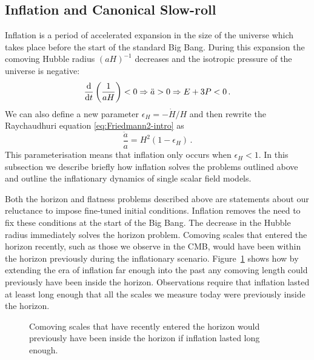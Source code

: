\subsection{Inflation and Canonical Slow-roll}
\label{sec:slowroll-intro}

Inflation is a period of accelerated expansion in the size of the universe
which takes place before the start of the standard Big Bang. During this
expansion the comoving Hubble radius $(aH)^{-1}$ decreases and the isotropic
pressure of the universe is negative:
\begin{equation}
\label{eq:infldefn-intro}
 \frac{\mathrm{d} }{\mathrm{d} t}\left( \frac{1}{aH}\right) <0 \Rightarrow \ddot{a}>0
  \Rightarrow E + 3P < 0 \,.
\end{equation}
We can also define a new parameter $\epsilon_H = -\dot{H}/H$ and then rewrite
the Raychaudhuri equation \eqref{eq:Friedmann2-intro} as
% 
\begin{equation}
 \label{eq:Friedeps-intro}
 \frac{\ddot{a}}{a} = H^2 (1-\epsilon_H)\,.
\end{equation}
% 
This parameterisation means that inflation only occurs when $\epsilon_H<1$.
In this subsection we describe briefly how inflation solves the problems
outlined above and outline the inflationary dynamics of single scalar field
models. 

Both the horizon and flatness problems described above are statements about our
reluctance to impose fine-tuned initial conditions. Inflation removes the need
to fix these conditions at the start of the Big Bang.
The decrease in the Hubble radius immediately solves the horizon problem.
Comoving scales that entered the horizon recently, such as those we observe in
the CMB, would have been within the horizon previously during the inflationary
scenario. Figure~\ref{fig:comovingscales-intro} shows how by extending
the era of inflation far enough into the past any comoving length could
previously have been inside the horizon.
Observations require that inflation lasted at leasst long enough that all the
scales we measure today were previously inside the horizon. 
% 
\begin{figure}
 \caption{Comoving scales that have recently entered the horizon would
previously have been inside the horizon if inflation lasted long enough.}
 \label{fig:comovingscales-intro}
\end{figure}
% 


